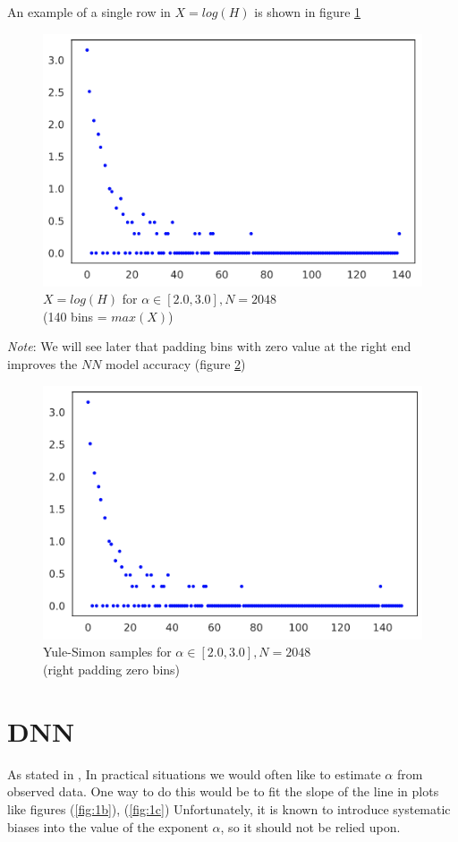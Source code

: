 \documentclass[a4paper, 12pt]{report}
\begin{document}
\pagebreak
\par An example of a single row in $X = log(H)$ is shown in figure  \ref{fig:2}

\begin{figure}[h]
\centering
\includegraphics[width=0.7\linewidth]{./dataset}
\caption[Yule-Simon log-scale]{$X = log(H)$ for $\alpha\in[2.0,3.0], N=2048$ \\(140 bins = $max(X)$)}
\label{fig:2}
\end{figure}

\textit{Note}: We will see later that padding bins with zero value at the right end improves the $NN$ model accuracy (figure  \ref{fig:3})

\begin{figure}[h]
\centering
\includegraphics[width=0.7\linewidth]{./dataset-zeros}
\caption[Yule-Simon log-scale with zero padding]{Yule-Simon samples for $\alpha\in[2.0,3.0], N=2048$ \\(right padding zero bins)}
\label{fig:3}
\end{figure}

\pagebreak
\section{DNN}
\par As stated in \cite{newman}, In practical situations we would often like to estimate $\alpha$ from observed data. One way to do this would be to fit the slope of the line in plots like figures (\ref{fig:1b}), (\ref{fig:1c}) Unfortunately, it is known to introduce systematic biases into the value of the exponent $\alpha$, so it should not be relied
upon.
\end{document}

